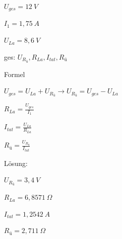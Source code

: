 $U_{ges} = 12~V$

$I_1 = 1,75~A$

$U_{La} = 8,6~V$

ges: $U_{R_\text{ü}}, R_{La}, I_{tat}, R_\text{ü}$

Formel

$U_{ges} = U_{La} + U_{R_\text{ü}} \to U_{R_\text{ü}} = U_{ges} - U_{La}$

$R_{La} = \frac{U_{ges}}{I_1}$

$I_{tat} = \frac{U_{La}}{R_{La}}$

$R_\text{ü} = \frac{U_{R_\text{ü}}}{I_{tat}}$

Lösung:

$U_{R_\text{ü}} = 3,4~V$

$R_{La} = 6,8571~\Omega$

$I_{tat} = 1,2542~A$

$R_\text{ü} = 2,711~\Omega$

